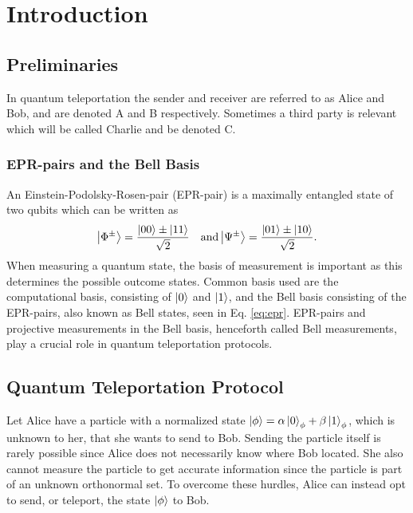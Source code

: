 \section{Introduction}
\begin{comment}
\begin{mybox}{Bullet points}
    \begin{itemize}
        \item Quantum teleportation protocol
        \item Why is it needed?
        \item Areas of application, quantum communications, quantum computers
        \item what is needed to realize it on a large scale, i.e. quantum repeaters, memory...
        \item EPR-pairs and bell basis
    \end{itemize}
\end{mybox}
\end{comment}
\subsection{Preliminaries}
In quantum teleportation the sender and receiver are referred to as Alice and Bob, and are denoted A and B respectively. Sometimes a third party is relevant which will be called Charlie and be denoted C. \cite{Nielsen:2010}

\subsubsection{EPR-pairs and the Bell Basis}
An Einstein-Podolsky-Rosen-pair (EPR-pair) is a maximally entangled state of two qubits \cite{Nielsen:2010} which can be written as
\begin{equation}
    \ket{\Phi^\pm} = \frac{\ket{00} \pm \ket{11}}{\sqrt{2}} \quad \text{and} \ket{\Psi^\pm} = \frac{\ket{01} \pm \ket{10}}{\sqrt{2}}.\label{eq:epr}
\end{equation}
When measuring a quantum state, the basis of measurement is important as this determines the possible outcome states. Common basis used are the computational basis, consisting of $\ket{0}$ and $\ket{1}$, and the Bell basis consisting of the EPR-pairs, also known as Bell states, seen in Eq. \eqref{eq:epr}. EPR-pairs and projective measurements in the Bell basis, henceforth called Bell measurements, play a crucial role in quantum teleportation protocols. \cite{Nielsen:2010}


\subsection{Quantum Teleportation Protocol}
Let Alice have a particle with a normalized state $\ket{\phi} = \alpha \ket{0}_\phi + \beta \ket{1}_\phi$, which is unknown to her, that she wants to send to Bob. Sending the particle itself is rarely possible since Alice does not necessarily know where Bob located. She also cannot measure the particle to get accurate information since the particle is part of an unknown orthonormal set. To overcome these hurdles, Alice can instead opt to send, or teleport, the state $\ket{\phi}$ to Bob. \cite{Bennett:1993}

